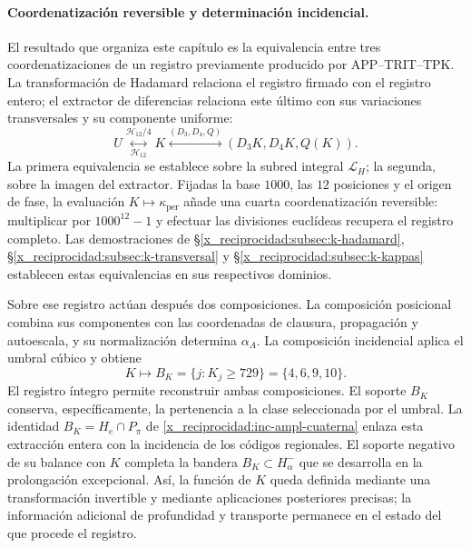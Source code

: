 \paragraph{Coordenatización reversible y determinación incidencial.}
\label{x_reciprocidad:ampl-alfa-k-intro-reversible}
El resultado que organiza este capítulo es la equivalencia entre tres
coordenatizaciones de un registro previamente producido por
APP--TRIT--TPK. La transformación de Hadamard relaciona el registro
firmado con el registro entero; el extractor de diferencias relaciona
este último con sus variaciones transversales y su componente uniforme:
\[
 U\underset{\mathcal H_{12}}{\overset{\mathcal H_{12}/4}{\longleftrightarrow}}K
 \overset{(D_3,D_4,Q)}{\longleftrightarrow}
 (D_3K,D_4K,Q(K)).
\]
La primera equivalencia se establece sobre la subred integral
$\mathcal L_H$; la segunda, sobre la imagen del extractor. Fijadas la
base $1000$, las $12$ posiciones y el origen de fase, la evaluación
$K\mapsto\kappa_{\mathrm{per}}$ añade una cuarta coordenatización
reversible: multiplicar por $1000^{12}-1$ y efectuar las divisiones
euclídeas recupera el registro completo. Las demostraciones de
\S\ref{x_reciprocidad:subsec:k-hadamard}, \S\ref{x_reciprocidad:subsec:k-transversal} y
\S\ref{x_reciprocidad:subsec:k-kappas} establecen estas equivalencias en sus respectivos
dominios.

Sobre ese registro actúan después dos composiciones. La composición
posicional combina sus componentes con las coordenadas de clausura,
propagación y autoescala, y su normalización determina $\alpha_A$. La
composición incidencial aplica el umbral cúbico y obtiene
\[
 K\longmapsto B_K=\{j:K_j\geq729\}=\{4,6,9,10\}.
\]
El registro íntegro permite reconstruir ambas composiciones. El soporte
$B_K$ conserva, específicamente, la pertenencia a la clase seleccionada
por el umbral. La identidad $B_K=H_e\cap P_\pi$ de
\eqref{x_reciprocidad:inc-ampl-cuaterna} enlaza esta extracción entera con la incidencia
de los códigos regionales. El soporte negativo de su balance con $K$
completa la bandera $B_K\subset H^-_\alpha$ que se desarrolla en la
prolongación excepcional. Así, la función de $K$ queda definida mediante
una transformación invertible y mediante aplicaciones posteriores
precisas; la información adicional de profundidad y transporte permanece
en el estado del que procede el registro.

